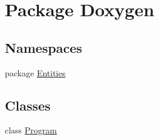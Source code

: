 \hypertarget{namespace_doxygen}{\section{Package Doxygen}
\label{namespace_doxygen}
}
\subsection*{Namespaces}
\begin{DoxyCompactItemize}
\item 
package \hyperlink{namespace_doxygen_1_1_entities}{Entities}
\end{DoxyCompactItemize}
\subsection*{Classes}
\begin{DoxyCompactItemize}
\item 
class \hyperlink{class_doxygen_1_1_program}{Program}
\end{DoxyCompactItemize}
